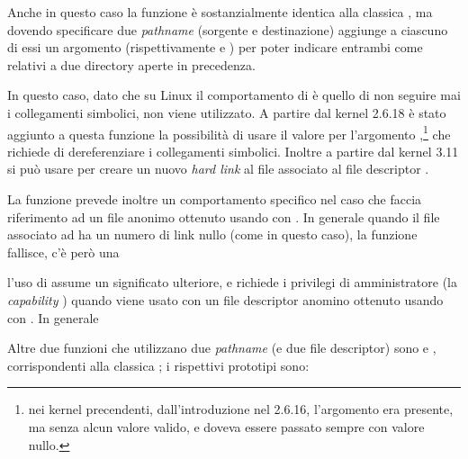 Anche in questo caso la funzione è sostanzialmente identica alla classica
, ma dovendo specificare due \textit{pathname} (sorgente e
destinazione) aggiunge a ciascuno di essi un argomento (rispettivamente
 e ) per poter indicare entrambi come relativi
a due directory aperte in precedenza.

In questo caso, dato che su Linux il comportamento di  è quello di
non seguire mai i collegamenti simbolici,  non
viene utilizzato. A partire dal kernel 2.6.18 è stato aggiunto a questa
funzione la possibilità di usare il valore  per
l'argomento ,\footnote{nei kernel precendenti, dall'introduzione
  nel 2.6.16, l'argomento  era presente, ma senza alcun valore
  valido, e doveva essere passato sempre con valore nullo.}  che richiede di
dereferenziare i collegamenti simbolici. Inoltre a partire dal kernel 3.11 si
può usare  per creare un nuovo \textit{hard link} al
file associato al file descriptor .



La funzione prevede inoltre un comportamento specifico nel caso che
 faccia riferimento ad un file anonimo ottenuto usando
 con . In generale quando il file associato ad
 ha un numero di link nullo (come in questo caso), la funzione
fallisce, c'è però una 


l'uso di  assume un significato
ulteriore, e richiede i privilegi di amministratore (la \textit{capability}
) quando viene usato con un file descriptor
anomino ottenuto usando  con . In generale


Altre due funzioni che utilizzano due \textit{pathname} (e due file
descriptor) sono  e , corrispondenti alla
classica ; i rispettivi prototipi sono:

